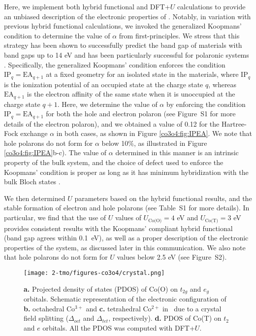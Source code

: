 Here, we implement both hybrid functional and DFT+$U$ calculations to provide an unbiased description of the electronic properties of \co. Notably, in variation with previous hybrid functional calculations, we invoked the generalized Koopmans' condition to determine the value of $\alpha$ from first-principles. We stress that this strategy has been shown to successfully predict the band gap of materials with band gaps up to 14 eV and has been particularly successful for polaronic systems \cite{miceli2018,smart2018fundamental,liu2018electron,lany2011predicting}. Specifically, the generalized Koopmans' condition enforces the condition $\text{IP}_q=\text{EA}_{q+1}$ at a fixed geometry for an isolated state in the materials, where $\text{IP}_q$ is the ionization potential of an occupied state at the charge state $q$, whereas $\text{EA}_{q+1}$ is the electron affinity of the same state when it is unoccupied at the charge state $q+1$.  Here, we determine the value of $\alpha$ by enforcing the condition $\text{IP}_q=\text{EA}_{q+1}$ for both the hole and electron polaron (see Figure~S1 for more details of the electron polaron), and we obtained a value of 0.12 for the Hartree-Fock exchange $\alpha$ in both cases, as shown in Figure \ref{co3o4:fig:IPEA}. We note that hole polarons do not form for $\alpha$ below 10\%, as illustrated in Figure \ref{co3o4:fig:IPEA}b-c). The value of $\alpha$ determined in this manner is an intrinsic property of the bulk system, and the choice of defect used to enforce the Koopmans’ condition is proper as long as it has minimum hybridization with the bulk Bloch states \cite{bischoff2019adjustable,miceli2018,smart2018fundamental}.

We then determined $U$ parameters based on the hybrid functional results, and the stable formation of electron and hole polarons (see Table~S1 for more details). In particular, we find that the use of $U$ values of $U_\text{Co(O)}=4$ eV and $U_\text{Co(T)}=3$ eV provides consistent results with the Koopmans' compliant hybrid functional (band gap agrees within 0.1~eV), as well as a proper description of the electronic properties of the system, as discussed later in this communication. We also note that hole polarons do not form for $U$ values below 2.5 eV (see Figure~S2).

\begin{figure}[t]
\begin{center}
\texttt{[image: 2-tmo/figures-co3o4/crystal.png]}
\caption{\textbf{a.} Projected density of states (PDOS) of Co(O) on $t_{2g}$ and $e_g$ orbitals. Schematic representation of the electronic configuration of \textbf{b.} octahedral Co$^{3+}$ and \textbf{c.} tetrahedral Co$^{2+}$ in \co\ due to a crystal field splitting ($\Delta_{oct}$ and $\Delta_{tet}$, respectively). \textbf{d.} PDOS of Co(T) on $t_2$ and $e$ orbitals. All the PDOS was computed with DFT+$U$.}
\label{co3o4:fig:split}
\end{center}
\end{figure}

